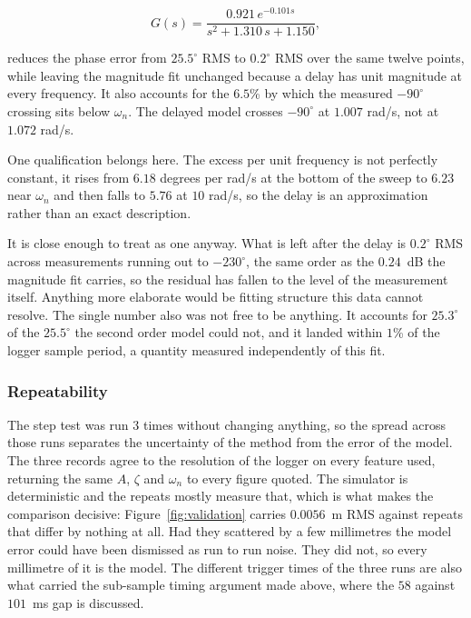 \begin{equation}\label{eqn:identified_delay}
    G(s) = \frac{0.921\,e^{-0.101s}}{s^2 + 1.310\,s + 1.150},
\end{equation}

reduces the phase error from $25.5^\circ$ RMS to $0.2^\circ$ RMS over the same twelve points,
while leaving the magnitude fit unchanged because a delay has unit magnitude at every
frequency. It also accounts for the $6.5$\% by which the measured $-90^\circ$ crossing sits
below $\omega_n$. The delayed model crosses $-90^\circ$ at $1.007$ rad/s, not at $1.072$ rad/s.

One qualification belongs here. The excess per unit frequency is not perfectly constant, it
rises from $6.18$ degrees per rad/s at the bottom of the sweep to $6.23$ near $\omega_n$ and
then falls to $5.76$ at $10$ rad/s, so the delay is an
approximation rather than an exact description.

It is close enough to treat as one anyway. What is left after the delay is $0.2^\circ$ RMS
across measurements running out to $-230^\circ$, the same order as the $0.24$~dB the magnitude
fit carries, so the residual has fallen to the level of the measurement itself. Anything more
elaborate would be fitting structure this data cannot resolve. The single number also was not
free to be anything. It accounts for $25.3^\circ$ of the $25.5^\circ$ the second order model
could not, and it landed within $1$\% of the logger sample period, a quantity measured
independently of this fit.

\subsubsection*{Repeatability}

The step test was run $3$ times without changing anything, so the spread across those runs
separates the uncertainty of the method from the error of the model. The three records agree
to the resolution of the logger on every feature used, returning the same $A$, $\zeta$ and
$\omega_n$ to every figure quoted. The simulator is deterministic and the repeats mostly
measure that, which is what makes the comparison decisive: Figure~\ref{fig:validation}
carries $0.0056$~m RMS against repeats that differ by nothing at all. Had they scattered by a
few millimetres the model error could have been dismissed as run to run noise. They did not,
so every millimetre of it is the model. The different trigger times of the three runs are
also what carried the sub-sample timing argument made above, where the $58$ against $101$~ms
gap is discussed.

